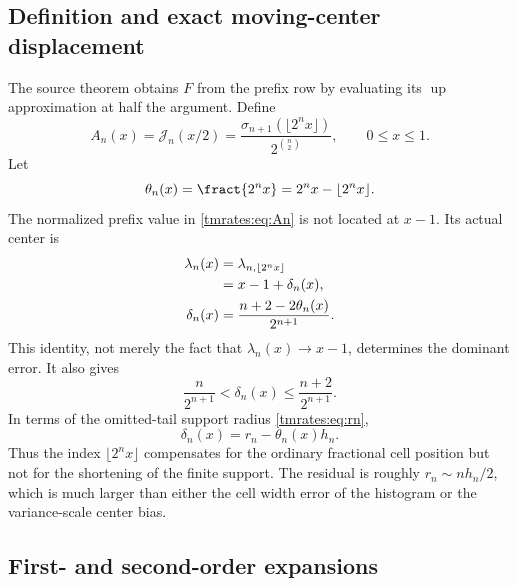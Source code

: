 \documentclass[11pt,oneside]{article}
\theoremstyle{definition}
\theoremstyle{remark}
\newcommand{\Up}{\operatorname{up}}
\begin{document}
\subsection{Definition and exact moving-center displacement}

The source theorem obtains $F$ from the prefix row by evaluating its $\Up$ approximation at
half the argument.  Define
\begin{equation}
 A_n(x)=\mathcal J_n(x/2)
 =\frac{\sigma_{n+1}(\lfloor2^nx\rfloor)}{2^{\binom n2}},
 \qquad 0\le x\le1.                                      \label{tmrates:eq:An}
\end{equation}
Let
\begin{equation}
 \theta_n(x)=\fract{2^nx}=2^nx-\lfloor2^nx\rfloor.        \label{tmrates:eq:theta}
\end{equation}
The normalized prefix value in \eqref{tmrates:eq:An} is not located at $x-1$.  Its actual center is
\begin{align}
 \lambda_n(x)
 &=\lambda_{n,\lfloor2^nx\rfloor} \notag\\
 &=x-1+\delta_n(x),                                        \label{tmrates:eq:lambda-drift}\\
 \delta_n(x)
 &=\frac{n+2-2\theta_n(x)}{2^{n+1}}.                       \label{tmrates:eq:delta}
\end{align}
This identity, not merely the fact that $\lambda_n(x)\to x-1$, determines the dominant error.
It also gives
\begin{equation}
 \frac{n}{2^{n+1}}<\delta_n(x)\le\frac{n+2}{2^{n+1}}.     \label{tmrates:eq:delta-range}
\end{equation}
In terms of the omitted-tail support radius \eqref{tmrates:eq:rn},
\begin{equation}
 \delta_n(x)=r_n-\theta_n(x)h_n.                           \label{tmrates:eq:delta-rn}
\end{equation}
Thus the index $\lfloor2^nx\rfloor$ compensates for the ordinary fractional cell position but
not for the shortening of the finite support.  The residual is roughly $r_n\sim nh_n/2$,
which is much larger than either the cell width error of the histogram or the variance-scale
center bias.

\subsection{First- and second-order expansions}
\end{document}
